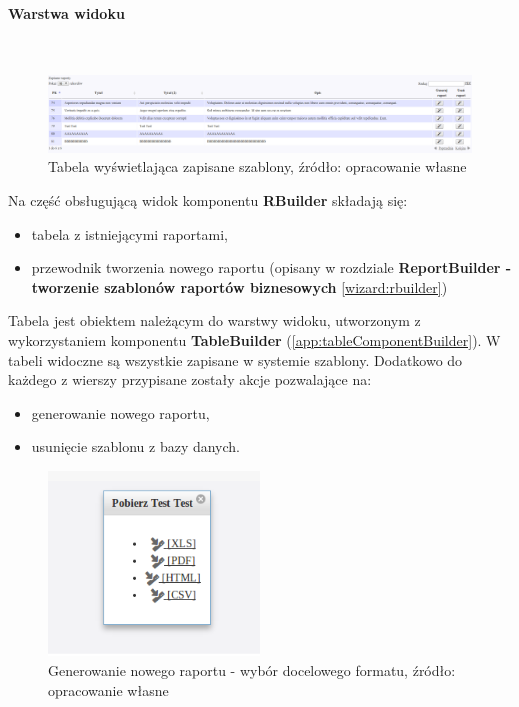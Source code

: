 	\paragraph{Warstwa widoku} 					\hspace{0pt} \\
	
	\begin{figure}[H]
		\centering
		\includegraphics[width=1.0\textwidth]{images/rbuilder_table}
		\caption[Tabela wyświetlająca zapisane szablony]{
			Tabela wyświetlająca zapisane szablony, źródło: opracowanie własne
		}
		\label{app:wizard_savedReports}
	\end{figure}	
	
	Na część obsługującą widok komponentu \textbf{RBuilder} składają się:
	\begin{itemize}
		\item tabela z istniejącymi raportami,
		\item przewodnik tworzenia nowego raportu (opisany w rozdziale \textbf{ReportBuilder - tworzenie szablonów raportów biznesowych} \ref{wizard:rbuilder})
	\end{itemize}

	Tabela jest obiektem należącym do warstwy widoku, utworzonym z wykorzystaniem komponentu \textbf{TableBuilder} (\ref{app:tableComponentBuilder}). W tabeli
	widoczne są wszystkie zapisane w systemie szablony. Dodatkowo do każdego z wierszy przypisane zostały akcje pozwalające na:
	\begin{itemize}
		\item generowanie nowego raportu,
		\item usunięcie szablonu z bazy danych.
	\end{itemize}
	
	\begin{figure}[H]
		\centering
		\includegraphics[width=0.5\textwidth]{images/rbuilder_generateReport}
		\caption[Generowanie nowego raportu - wybór docelowego formatu]{
			Generowanie nowego raportu - wybór docelowego formatu, źródło: opracowanie własne
		}
		\label{app:wizard_newReport_generateReport}
	\end{figure}
	
